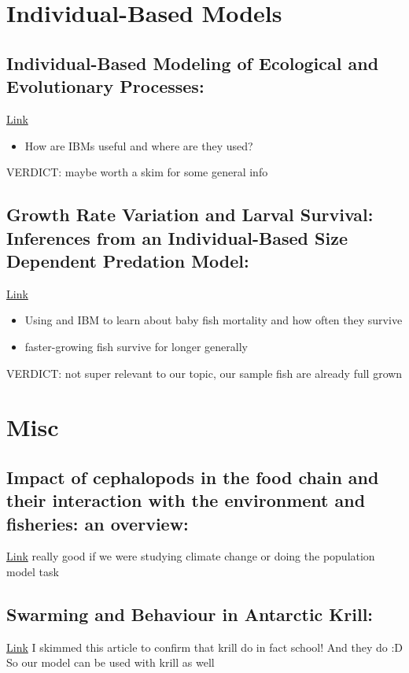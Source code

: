 \documentclass[12pt]{article}
\begin{document}

\section{Individual-Based Models}

\subsection{Individual-Based Modeling of Ecological and Evolutionary Processes: \cite{deangelis}}
\href{https://doi.org/10.1146/annurev.ecolsys.36.102003.152644}{Link}
\begin{itemize}
    \item How are IBMs useful and where are they used?
\end{itemize}
VERDICT: maybe worth a skim for some general info

\subsection{Growth Rate Variation and Larval Survival: Inferences from an Individual-Based Size Dependent Predation Model: \cite{rice}}
\href{https://doi.org/10.1139/f93-015}{Link}
\begin{itemize}
    \item Using and IBM to learn about baby fish mortality and how often they survive
    \item faster-growing fish survive for longer generally
\end{itemize}
VERDICT: not super relevant to our topic, our sample fish are already full grown

\section{Misc}

\subsection{Impact of cephalopods in the food chain and their interaction with the environment and fisheries: an overview: \cite{piatkowski}}
\href{https://doi.org/10.1016/S0165-7836(01)00226-0}{Link}
really good if we were studying climate change or doing the population model task

\subsection{Swarming and Behaviour in Antarctic Krill: \cite{tarling}}
\href{https://doi.org/10.1007/978-3-319-29279-3_8}{Link}
I skimmed this article to confirm that krill do in fact school! And they do :D So our model can be used with krill as well

\newpage
\printbibliography[heading=bibintoc]
\end{document}
